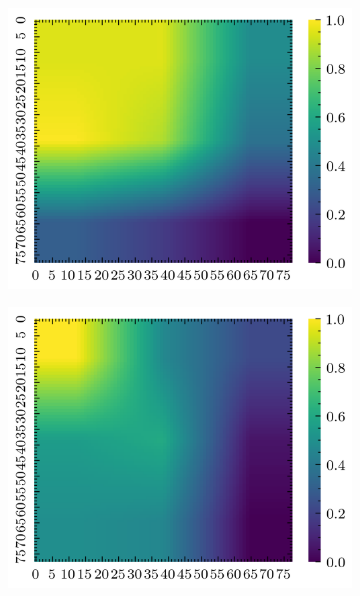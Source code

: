 \documentclass[../document.tex]{subfiles}
\begin{document}
\begin{figure}[H]
\begin{subfigure}[b]{0.19\textwidth}
        \includegraphics[width=\linewidth]{../img/5/quarry/worst/grad-cam-2d-2.png}
    \end{subfigure}
    \begin{subfigure}[b]{0.19\textwidth}
        \includegraphics[width=\linewidth]{../img/5/quarry/worst/grad-cam-2d-3.png}
    \end{subfigure}  
    \begin{subfigure}[b]{0.19\textwidth}

\end{subfigure}
\end{figure}
\end{document}
